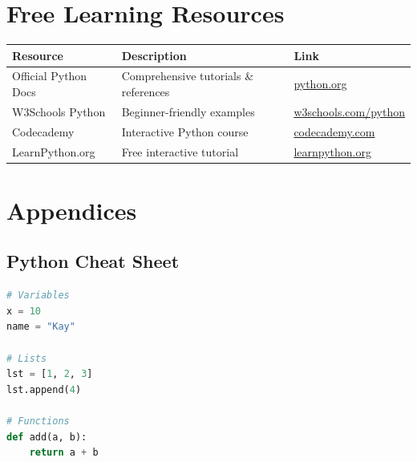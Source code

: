 \documentclass{article}
\begin{document}
\section{Free Learning Resources}

\begin{table}[h]
\centering
\begin{tabular}{|l|l|l|}
\hline
\textbf{Resource} & \textbf{Description} & \textbf{Link} \\
\hline
Official Python Docs & Comprehensive tutorials \& references & \href{https://docs.python.org/3/}{python.org} \\
W3Schools Python & Beginner-friendly examples & \href{https://www.w3schools.com/python/}{w3schools.com/python} \\
Codecademy & Interactive Python course & \href{https://www.codecademy.com/learn/learn-python-3}{codecademy.com} \\
LearnPython.org & Free interactive tutorial & \href{https://www.learnpython.org/}{learnpython.org} \\
\hline
\end{tabular}
\end{table}

\section{Appendices}

\subsection{Python Cheat Sheet}

\begin{lstlisting}[language=Python]
# Variables
x = 10
name = "Kay"

# Lists
lst = [1, 2, 3]
lst.append(4)

# Functions
def add(a, b):
    return a + b
\end{lstlisting}
\end{document}
